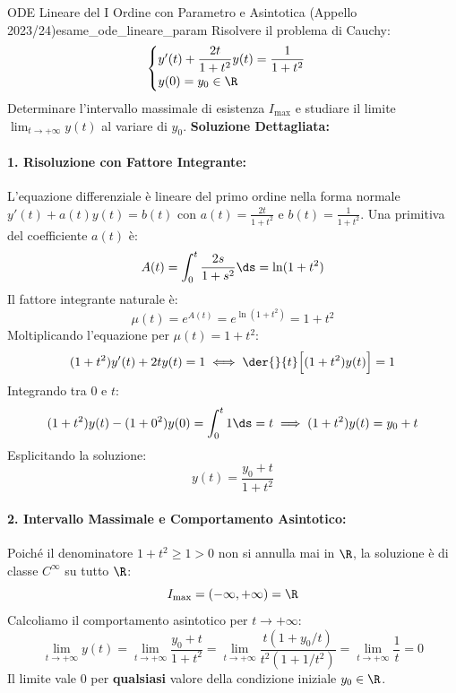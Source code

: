 \begin{esempio}{ODE Lineare del I Ordine con Parametro e Asintotica (Appello 2023/24)}{esame_ode_lineare_param}
Risolvere il problema di Cauchy:
\[
    \begin{cases}
        y'(t) + \dfrac{2t}{1 + t^2} y(t) = \dfrac{1}{1 + t^2} \\
        y(0) = y_0 \in \R
    \end{cases}
\]
Determinare l'intervallo massimale di esistenza $I_{\max}$ e studiare il limite $\lim_{t \to +\infty} y(t)$ al variare di $y_0$.
\tcblower
\textbf{Soluzione Dettagliata:}

\paragraph{1. Risoluzione con Fattore Integrante:}
L'equazione differenziale è lineare del primo ordine nella forma normale $y'(t) + a(t)y(t) = b(t)$ con $a(t) = \frac{2t}{1+t^2}$ e $b(t) = \frac{1}{1+t^2}$.
Una primitiva del coefficiente $a(t)$ è:
\[
    A(t) = \int_0^t \frac{2s}{1 + s^2}\ds = \ln(1 + t^2)
\]
Il fattore integrante naturale è:
\[
    \mu(t) = e^{A(t)} = e^{\ln(1 + t^2)} = 1 + t^2
\]
Moltiplicando l'equazione per $\mu(t) = 1 + t^2$:
\[
    (1 + t^2)y'(t) + 2t y(t) = 1 \iff \der{}{t}\Big[ (1 + t^2)y(t) \Big] = 1
\]
Integrando tra $0$ e $t$:
\[
    (1 + t^2)y(t) - (1 + 0^2)y(0) = \int_0^t 1\ds = t \implies (1 + t^2)y(t) = y_0 + t
\]
Esplicitando la soluzione:
\[
    y(t) = \frac{y_0 + t}{1 + t^2}
\]

\paragraph{2. Intervallo Massimale e Comportamento Asintotico:}
Poiché il denominatore $1 + t^2 \ge 1 > 0$ non si annulla mai in $\R$, la soluzione è di classe $C^\infty$ su tutto $\R$:
\[
    I_{\max} = (-\infty, +\infty) = \R
\]
Calcoliamo il comportamento asintotico per $t \to +\infty$:
\[
    \lim_{t \to +\infty} y(t) = \lim_{t \to +\infty} \frac{y_0 + t}{1 + t^2} = \lim_{t \to +\infty} \frac{t(1 + y_0/t)}{t^2(1 + 1/t^2)} = \lim_{t \to +\infty} \frac{1}{t} = 0
\]
Il limite vale $0$ per \textbf{qualsiasi} valore della condizione iniziale $y_0 \in \R$.
\end{esempio}
